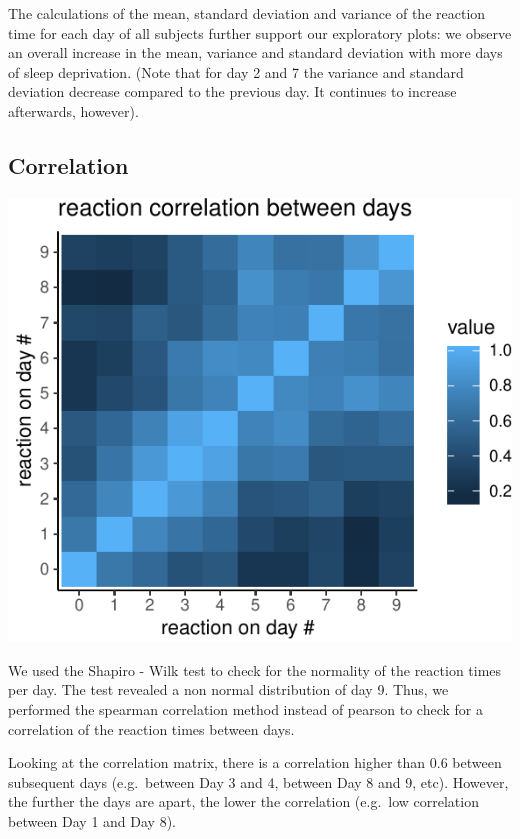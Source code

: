\documentclass[
]{article}
\begin{document}
The calculations of the mean, standard deviation and variance of the
reaction time for each day of all subjects further support our
exploratory plots: we observe an overall increase in the mean, variance
and standard deviation with more days of sleep deprivation. (Note that
for day 2 and 7 the variance and standard deviation decrease compared to
the previous day. It continues to increase afterwards, however).

\hypertarget{correlation}{%
\subsection{Correlation}\label{correlation}}

\begin{center}\includegraphics{common_sleep_files/figure-latex/spearman_tile-1} \end{center}

We used the Shapiro - Wilk test to check for the normality of the
reaction times per day. The test revealed a non normal distribution of
day 9. Thus, we performed the spearman correlation method instead of
pearson to check for a correlation of the reaction times between days.

Looking at the correlation matrix, there is a correlation higher than
0.6 between subsequent days (e.g.~between Day 3 and 4, between Day 8 and
9, etc). However, the further the days are apart, the lower the
correlation (e.g.~low correlation between Day 1 and Day 8).
\end{document}
